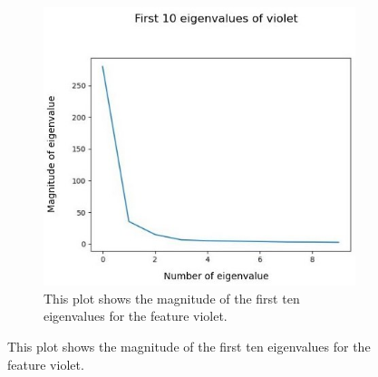 
\begin{figure}[!h]
	\centering
	\begin{subfigure}{0.7\textwidth}
		\includegraphics[width=0.9\linewidth]{Figures/chapter04/pca_violet_graph.png} 
		\caption{This plot shows the magnitude of the first ten eigenvalues for the feature violet.}
	\end{subfigure}
	\vspace{20pt}
	

\end{figure}
